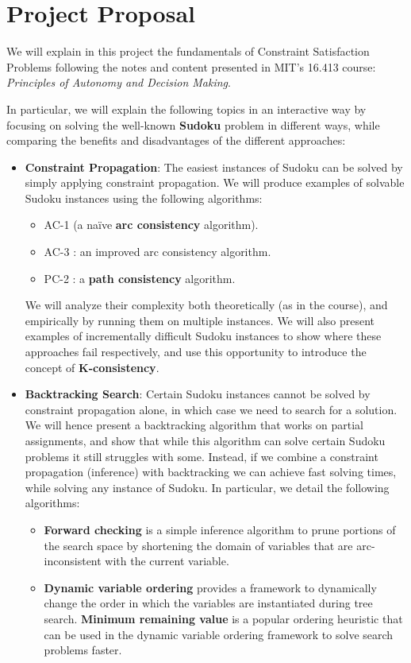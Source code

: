 \chapter{Project Proposal}\label{sec:project_proposal}

We will explain in this project the fundamentals of Constraint Satisfaction Problems following the notes and content presented in MIT's 16.413 course: \textit{Principles of Autonomy and Decision Making}.

In particular, we will explain the following topics in an interactive way by focusing on solving the well-known \textbf{Sudoku} problem in different ways, while comparing the benefits and disadvantages of the different approaches:
\begin{itemize}
  \item \textbf{Constraint Propagation}:
    The easiest instances of Sudoku can be solved by simply applying constraint propagation. We will produce examples of solvable Sudoku instances using the following algorithms:
    \begin{itemize}
      \item AC-1 (a na\"ive \textbf{arc consistency} algorithm).
      \item AC-3 \cite{MACKWORTH197799}: an improved arc consistency algorithm.
      \item PC-2 \cite{MACKWORTH197799}: a \textbf{path consistency} algorithm.
    \end{itemize}
    We will analyze their complexity both theoretically (as in the course), and empirically by running them on multiple instances.
    We will also present examples of incrementally difficult Sudoku instances to show where these approaches fail respectively, and use this opportunity to introduce the concept of \textbf{K-consistency}.
  \item \textbf{Backtracking Search}:
    Certain Sudoku instances cannot be solved by constraint propagation alone, in which case we need to search for a solution.
    We will hence present a backtracking algorithm that works on partial assignments, and show that while this algorithm can solve certain Sudoku problems it still struggles with some.
    Instead, if we combine a constraint propagation (inference) with backtracking we can achieve fast solving times, while solving any instance of Sudoku.
    In particular, we detail the following algorithms:
    \begin{itemize}
      \item \textbf{Forward checking} \cite{HARALICK1980263} is a simple inference algorithm to prune portions of the search space by shortening the domain of variables that are arc-inconsistent with the current variable.
      \item \textbf{Dynamic variable ordering} \cite{bacchus1995dynamic} provides a framework to dynamically change the order in which the variables are instantiated during tree search. \textbf{Minimum remaining value} is a popular ordering heuristic that can be used in the dynamic variable ordering framework to solve search problems faster.
    \end{itemize}


\end{itemize}
